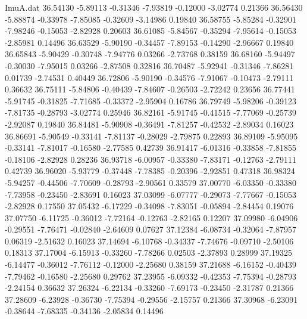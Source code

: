 \begin{filecontents}{ImuA.dat}
  36.54130   -5.89113   -0.31346   -7.93819   -0.12000   -3.02774    0.21366
  36.56430   -5.88874   -0.33978   -7.85085   -0.32609   -3.14986    0.19840
  36.58755   -5.85284   -0.32901   -7.98246   -0.15053   -2.82928    0.20603
  36.61085   -5.84567   -0.35294   -7.95614   -0.15053   -2.85981    0.14496
  36.63529   -5.90190   -0.34457   -7.89153   -0.14290   -2.96667    0.19840
  36.65843   -5.90429   -0.30748   -7.94776    0.03266   -2.73768    0.38159
  36.68160   -5.94497   -0.30030   -7.95015    0.03266   -2.87508    0.32816
  36.70487   -5.92941   -0.31346   -7.86281    0.01739   -2.74531    0.40449
  36.72806   -5.90190   -0.34576   -7.91067   -0.10473   -2.79111    0.36632
  36.75111   -5.84806   -0.40439   -7.84607   -0.26503   -2.72242    0.23656
  36.77441   -5.91745   -0.31825   -7.71685   -0.33372   -2.95904    0.16786
  36.79749   -5.98206   -0.39123   -7.81735   -0.28793   -3.02774    0.25946
  36.82161   -5.91745   -0.41515   -7.77069   -0.25739   -2.92087    0.19840
  36.84481   -5.90908   -0.36491   -7.81257   -0.42532   -2.89034    0.16023
  36.86691   -5.90549   -0.33141   -7.81137   -0.28029   -2.79875    0.22893
  36.89109   -5.95095   -0.33141   -7.81017   -0.16580   -2.77585    0.42739
  36.91417   -6.01316   -0.33858   -7.81855   -0.18106   -2.82928    0.28236
  36.93718   -6.00957   -0.33380   -7.83171   -0.12763   -2.79111    0.42739
  36.96020   -5.93779   -0.37448   -7.78385   -0.20396   -2.92851    0.47318
  36.98324   -5.94257   -0.44506   -7.70609   -0.28793   -2.90561    0.33579
  37.00770   -6.03350   -0.33380   -7.73958   -0.23450   -2.83691    0.16023
  37.03099   -6.07777   -0.29073   -7.77667   -0.15053   -2.82928    0.17550
  37.05432   -6.17229   -0.34098   -7.83051   -0.05894   -2.84454    0.19076
  37.07750   -6.11725   -0.36012   -7.72164   -0.12763   -2.82165    0.12207
  37.09980   -6.04906   -0.29551   -7.76471   -0.02840   -2.64609    0.07627
  37.12384   -6.08734   -0.32064   -7.87957    0.06319   -2.51632    0.16023
  37.14694   -6.10768   -0.34337   -7.74676   -0.09710   -2.50106    0.18313
  37.17004   -6.15913   -0.33260   -7.78266    0.02503   -2.37893    0.28999
  37.19325   -6.14477   -0.36012   -7.76112   -0.12000   -2.25680    0.38159
  37.21688   -6.16152   -0.40439   -7.79462   -0.16580   -2.25680    0.29762
  37.23955   -6.09332   -0.42353   -7.75394   -0.28793   -2.24154    0.36632
  37.26324   -6.22134   -0.33260   -7.69173   -0.23450   -2.31787    0.21366
  37.28609   -6.23928   -0.36730   -7.75394   -0.29556   -2.15757    0.21366
  37.30968   -6.23091   -0.38644   -7.68335   -0.34136   -2.05834    0.14496

\end{filecontents}
